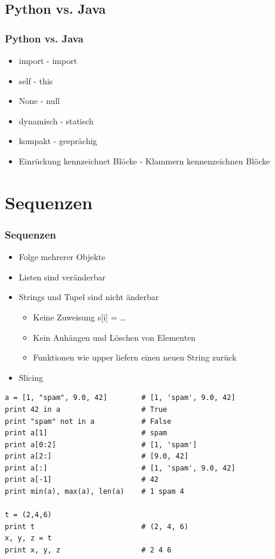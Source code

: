 \documentclass[10pt]{beamer}
\begin{document}
\subsection{Python vs. Java}
\begin{frame}
  \frametitle{Python vs. Java}
  \begin{itemize}
   \item import - import
   \item self - this
   \item None - null
   \item dynamisch - statisch
   \item kompakt - gesprächig
   \item Einrückung kennzeichnet Blöcke - Klammern kennenzeichnen Blöcke
  \end{itemize}
\end{frame}

\section{Sequenzen}
\begin{frame}[fragile]
  \frametitle{Sequenzen}
  \begin{itemize}
   \item Folge mehrerer Objekte
   \item Listen sind veränderbar
   \item Strings und Tupel sind nicht änderbar
   \begin{itemize}
    \item Keine Zuweisung s[i] = \dots
    \item Kein Anhängen und Löschen von Elementen
    \item Funktionen wie upper liefern einen neuen String zurück
   \end{itemize}
   \item Slicing
  \end{itemize}
\begin{lstlisting}
a = [1, "spam", 9.0, 42]        # [1, 'spam', 9.0, 42]
print 42 in a                   # True
print "spam" not in a           # False
print a[1]                      # spam
print a[0:2]                    # [1, 'spam']
print a[2:]                     # [9.0, 42]
print a[:]                      # [1, 'spam', 9.0, 42]
print a[-1]                     # 42
print min(a), max(a), len(a)    # 1 spam 4

t = (2,4,6)
print t                         # (2, 4, 6)
x, y, z = t
print x, y, z                   # 2 4 6
\end{lstlisting}
\end{frame}
\end{document}
